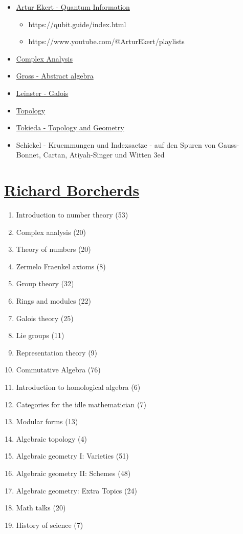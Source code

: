 \documentclass[10pt,a4paper]{book}
\theoremstyle{definition}
\begin{document}
\begin{itemize}
\item \href{https://www.arturekert.org/iqis}{Artur Ekert - Quantum Information}
\begin{itemize}
\item https://qubit.guide/index.html
\item https://www.youtube.com/@ArturEkert/playlists
\end{itemize}
\item \href{https://www.youtube.com/@StokesLine}{Complex Analysis}
\item \href{https://www.youtube.com/watch?v=VdLhQs_y_E8&list=PLelIK3uylPMGzHBuR3hLMHrYfMqWWsmx5}{Gross - Abstract algebra}
\item \href{https://www.maths.ed.ac.uk/~tl/gt/gt.pdf}{Leinster - Galois}
\item \href{http://www.math.toronto.edu/ivan/mat327/?resources}{Topology}
\item \href{https://www.youtube.com/watch?v=SXHHvoaSctc&list=PLTBqohhFNBE_09L0i-lf3fYXF5woAbrzJ}{Tokieda - Topology and Geometry}
\item Schiekel - Kruemmungen und Indexsaetze - auf den Spuren von Gauss-Bonnet, Cartan, Atiyah-Singer und Witten 3ed

\end{itemize}
\section{\href{https://www.youtube.com/@richarde.borcherds7998/playlists}{Richard Borcherds}}
\begin{enumerate}
\item Introduction to number theory (53)
\item Complex analysis (20)
\item Theory of numbers (20)
\item Zermelo Fraenkel axioms (8)
\item Group theory (32)
\item Rings and modules (22)
\item Galois theory (25)
\item Lie groups (11)
\item Representation theory (9)
\item Commutative Algebra (76)
\item Introduction to homological algebra (6)
\item Categories for the idle mathematician (7)
\item Modular forms (13)
\item Algebraic topology (4)
\item Algebraic geometry I: Varieties (51)
\item Algebraic geometry II: Schemes (48)
\item Algebraic geometry: Extra Topics (24)
\item Math talks (20)
\item History of science (7)
\end{enumerate}
\end{document}
